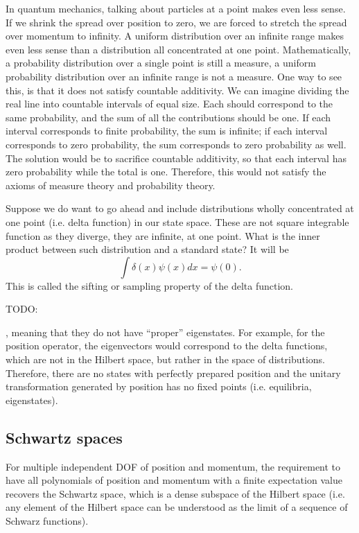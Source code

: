 In quantum mechanics, talking about particles at a point makes even less sense. If we shrink the spread over position to zero, we are forced to stretch the spread over momentum to infinity. A uniform distribution over an infinite range makes even less sense than a distribution all concentrated at one point. Mathematically, a probability distribution over a single point is still a measure, a uniform probability distribution over an infinite range is not a measure. One way to see this, is that it does not satisfy countable additivity. We can imagine dividing the real line into countable intervals of equal size. Each should correspond to the same probability, and the sum of all the contributions should be one. If each interval corresponds to finite probability, the sum is infinite; if each interval corresponds to zero probability, the sum corresponds to zero probability as well. The solution would be to sacrifice countable additivity, so that each interval has zero probability while the total is one. Therefore, this would not satisfy the axioms of measure theory and probability theory.

Suppose we do want to go ahead and include distributions wholly concentrated at one point (i.e. delta function) in our state space. These are not square integrable function as they diverge, they are infinite, at one point. What is the inner product between such distribution and a standard state? It will be
\begin{equation}
	\int \delta(x) \psi(x) dx = \psi(0).
\end{equation}
This is called the sifting or sampling property of the delta function.

TODO:

, meaning that they do not have ``proper'' eigenstates. For example, for the position operator, the eigenvectors would correspond to the delta functions, which are not in the Hilbert space, but rather in the space of distributions. Therefore, there are no states with perfectly prepared position and the unitary transformation generated by position has no fixed points (i.e. equilibria, eigenstates).


\subsection{Schwartz spaces}

For multiple independent DOF of position and momentum, the requirement to have all polynomials of position and momentum with a finite expectation value recovers the Schwartz space, which is a dense subspace of the Hilbert space (i.e. any element of the Hilbert space can be understood as the limit of a sequence of Schwarz functions).

